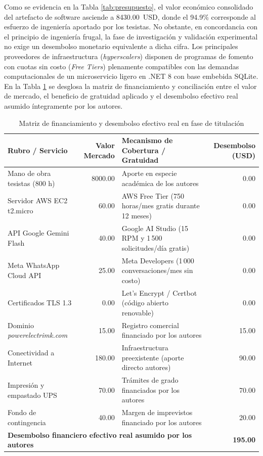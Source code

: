 Como se evidencia en la Tabla \ref{tab:presupuesto}, el valor económico consolidado del artefacto de software asciende a 8430.00~USD, donde el 94.9\% corresponde al esfuerzo de ingeniería aportado por los tesistas. No obstante, en concordancia con el principio de ingeniería frugal, la fase de investigación y validación experimental no exige un desembolso monetario equivalente a dicha cifra. Los principales proveedores de infraestructura (\textit{hyperscalers}) disponen de programas de fomento con cuotas sin costo (\textit{Free Tiers}) plenamente compatibles con las demandas computacionales de un microservicio ligero en .NET 8 con base embebida SQLite. En la Tabla \ref{tab:costos_operativos_reales} se desglosa la matriz de financiamiento y conciliación entre el valor de mercado, el beneficio de gratuidad aplicado y el desembolso efectivo real asumido íntegramente por los autores.

\begin{table}[H]
\centering
\caption{Matriz de financiamiento y desembolso efectivo real en fase de titulación}
\label{tab:costos_operativos_reales}
\small
\begin{tabular}{p{3.8cm} r p{4.6cm} r}
\toprule
\textbf{Rubro / Servicio} & \textbf{Valor Mercado} & \textbf{Mecanismo de Cobertura / Gratuidad} & \textbf{Desembolso (USD)} \\
\midrule
Mano de obra tesistas (800 h) & 8000.00 & Aporte en especie académica de los autores & 0.00 \\
Servidor AWS EC2 t2.micro & 60.00 & AWS Free Tier (750 horas/mes gratis durante 12 meses) & 0.00 \\
API Google Gemini Flash & 40.00 & Google AI Studio (15 RPM y 1\,500 solicitudes/día gratis) & 0.00 \\
Meta WhatsApp Cloud API & 25.00 & Meta Developers (1\,000 conversaciones/mes sin costo) & 0.00 \\
Certificados TLS 1.3 & 0.00 & Let's Encrypt / Certbot (código abierto renovable) & 0.00 \\
Dominio \textit{powerelectrimk.com} & 15.00 & Registro comercial financiado por los autores & 15.00 \\
Conectividad a Internet & 180.00 & Infraestructura preexistente (aporte directo autores) & 90.00 \\
Impresión y empastado UPS & 70.00 & Trámites de grado financiados por los autores & 70.00 \\
Fondo de contingencia & 40.00 & Margen de imprevistos financiado por los autores & 20.00 \\
\midrule
\multicolumn{3}{l}{\textbf{Desembolso financiero efectivo real asumido por los autores}} & \textbf{195.00} \\
\bottomrule
\end{tabular}
\end{table}

